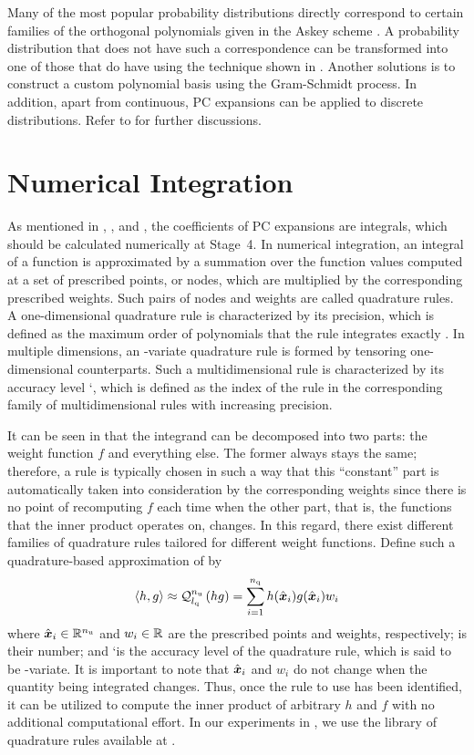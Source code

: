 Many of the most popular probability distributions directly correspond to
certain families of the orthogonal polynomials given in the Askey scheme
\cite{xiu2010}. A probability distribution that does not have such a
correspondence can be transformed into one of those that do have using the
technique shown in . Another solutions is to
construct a custom polynomial basis using the Gram-Schmidt process. In addition,
apart from continuous, PC expansions can be applied to discrete distributions.
Refer to \cite{xiu2010} for further discussions.

\section{Numerical Integration}

As mentioned in , , and
, the coefficients of PC expansions are integrals, which
should be calculated numerically at Stage~4. In numerical integration, an
integral of a function is approximated by a summation over the function values
computed at a set of prescribed points, or nodes, which are multiplied by the
corresponding prescribed weights. Such pairs of nodes and weights are called
quadrature rules. A one-dimensional quadrature rule is characterized by its
precision, which is defined as the maximum order of polynomials that the rule
integrates exactly \cite{heiss2008}. In multiple dimensions, an \nu-variate
quadrature rule is formed by tensoring one-dimensional counterparts. Such a
multidimensional rule is characterized by its accuracy level \lq, which is
defined as the index of the rule in the corresponding family of multidimensional
rules with increasing precision.

It can be seen in  that the integrand can be decomposed into
two parts: the weight function $f$ and everything else. The former always stays
the same; therefore, a rule is typically chosen in such a way that this
``constant'' part is automatically taken into consideration by the corresponding
weights since there is no point of recomputing $f$ each time when the other
part, that is, the functions that the inner product operates on, changes. In
this regard, there exist different families of quadrature rules tailored for
different weight functions. Define such a quadrature-based approximation of
 by
\begin{equation} \elab{quadrature}
  \innerproduct{h}{g} \approx \quadrature{\nu}{\lq}{h g}
  = \sum_{i = 1}^\nq h(\hat{\v{x}}_i) g(\hat{\v{x}}_i) w_i
\end{equation}
where $\hat{\boldsymbol{x}}_i \in \mathbb{R}^{n_\mathrm{u}}$ and $w_i \in \mathbb{R}$ are the prescribed
points and weights, respectively; \nq is their number; and \lq is the accuracy
level of the quadrature rule, which is said to be \nu-variate. It is important
to note that $\hat{\boldsymbol{x}}_i$ and $w_i$ do not change when the quantity being
integrated changes. Thus, once the rule to use has been identified, it can be
utilized to compute the inner product of arbitrary $h$ and $f$ with no
additional computational effort. In our experiments in
, we use the library of quadrature rules available at
\cite{burkardt2013}.

